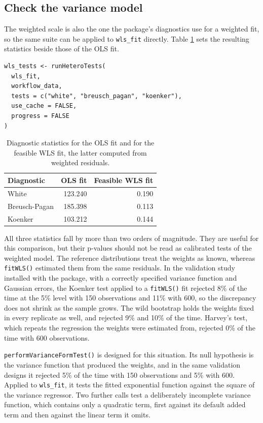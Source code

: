 \subsection{Check the variance model}\label{check-the-variance-model}

The weighted scale is also the one the package's diagnostics use for a
weighted fit, so the same suite can be applied to \texttt{wls\_fit} directly. Table
\ref{tab:workflow-retest-table} sets the resulting statistics beside those of
the OLS fit.

\begin{verbatim}
wls_tests <- runHeteroTests(
  wls_fit,
  workflow_data,
  tests = c("white", "breusch_pagan", "koenker"),
  use_cache = FALSE,
  progress = FALSE
)
\end{verbatim}

\begin{table}

\caption{\label{tab:workflow-retest-table}Diagnostic statistics for the OLS fit and for the feasible WLS fit, the latter computed from weighted residuals.}
\centering
\begin{tabular}[t]{lrr}
\toprule
Diagnostic & OLS fit & Feasible WLS fit\\
\midrule
White & 123.240 & 0.190\\
Breusch-Pagan & 185.398 & 0.113\\
Koenker & 103.212 & 0.144\\
\bottomrule
\end{tabular}
\end{table}

All three statistics fall by more than two orders of magnitude. They are
useful for this comparison, but their p-values should not be read as
calibrated tests of the weighted model. The reference distributions treat the
weights as known, whereas \texttt{fitWLS()} estimated them from the same residuals.
In the validation study installed with the package, with a correctly specified
variance function and Gaussian errors, the Koenker test applied to a
\texttt{fitWLS()} fit rejected
8\%
of the time at the 5\% level with 150 observations and
11\%
with 600, so the discrepancy does not shrink as the sample grows. The wild
bootstrap holds the weights fixed in every replicate as well, and rejected
9\%
and
10\%
of the time. Harvey's test, which repeats the regression the weights were
estimated from, rejected
0\%
of the time with 600 observations.

\texttt{performVarianceFormTest()} is designed for this situation. Its null
hypothesis is the variance function that produced the weights, and in the same
validation designs it rejected
5\%
of the time with 150 observations and
5\%
with 600. Applied to \texttt{wls\_fit}, it tests the fitted exponential function
against the square of the variance regressor. Two further calls test a
deliberately incomplete variance function, which contains only a quadratic
term, first against its default added term and then against the linear term it
omits.

